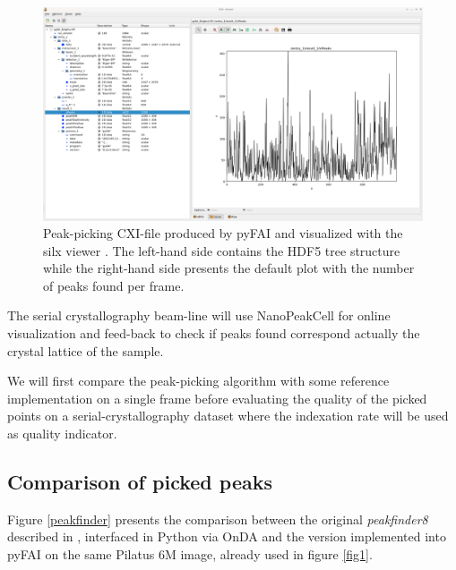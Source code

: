 \documentclass[preprint]{iucr}              %
\begin{document}
\begin{figure}
\label{silx}
\includegraphics[width=12cm]{silx_view}
\caption{Peak-picking CXI-file produced by pyFAI and visualized with the silx viewer \cite{silx}.
The left-hand side contains the HDF5 tree structure while the right-hand side presents the default plot with the number of peaks found per frame.}
\end{figure}


The serial crystallography beam-line will use NanoPeakCell \cite{nanopeakcell} for online visualization and feed-back to check if peaks found correspond actually the crystal lattice of the sample.

We will first compare the peak-picking algorithm with some reference implementation on a single frame before
evaluating the quality of the picked points on a serial-crystallography dataset where the indexation rate will be used as quality indicator.

\subsection{Comparison of picked peaks}
Figure \ref{peakfinder} presents the comparison between the original \textit{peakfinder8} described in , interfaced in Python via OnDA \cite{onda} and the version implemented into pyFAI on the same Pilatus 6M image, already used in figure \ref{fig1}. 
\end{document}

